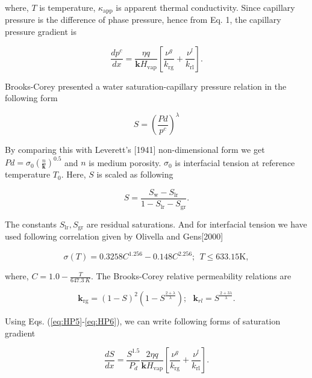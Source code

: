where, $T$ is temperature, $\kappa_{\mathrm {app}}$ is apparent thermal conductivity. Since capillary pressure is the difference of phase pressure, hence from Eq. 1, the capillary pressure gradient is

\begin{equation}
\frac{d p^c}{d x} = \frac{\eta q}{\mathbf k H_{\mathrm {vap}}}\left[\frac{\nu^g}{k_{\mathrm {rg}}} + \frac{\nu^l}{k_{\mathrm {rl}}}\right].
\label{eq:HP5}
\end{equation}

Brooks-Corey presented a water saturation-capillary pressure relation in the following form

\begin{equation}
S=\left(\frac{Pd}{p^c}\right)^\lambda
\label{eq:HP6}
\end{equation}

By comparing this with Leverett's [1941] non-dimensional form we get $Pd=\sigma_0\left(\frac{n}{\mathbf k}\right)^{0.5}$ and $n$ is medium porosity. $\sigma_0$ is interfacial tension at reference temperature $T_0$. Here, $S$ is scaled as following 

\begin{equation}
S=\frac{S_{\mathrm {w}}-S_{\mathrm {lr}}}{1-S_{\mathrm {lr}}-S_{\mathrm {gr}}}.
\label{eq:HP7}
\end{equation}

The constants $S_{\mathrm {lr}}, S_{\mathrm {gr}}$ are residual saturations. And for interfacial tension we have used following correlation given by Olivella and Gens[2000]

\begin{equation}
\sigma( T)={0.3258C^{1.256}} - {0.148C^{2.256}};~~ T\le 633.15 \mathrm K,
\label{eq:surface_tension}
\end{equation}

where, $C=1.0-\frac{T}{647.3~K}$. The Brooks-Corey relative permeability relations are

\begin{equation}
\mathbf k_{\mathrm {rg}}=\left(1-S\right)^2 \left(1-S^{\frac{2+\lambda}{\lambda}}\right);~~~\mathbf k_{rl}=S^{\frac{2+3\lambda}{\lambda}}.
\label{eq:HP8}
\end{equation}

Using Eqs. (\ref{eq:HP5}-\ref{eq:HP6}), we can write following forms of saturation gradient

\begin{equation}
\frac{d S}{d x}=\frac{S^{1.5}}{P_d}\frac{2\eta q}{\mathbf k H_{\mathrm {vap}}}\left[\frac{\nu^g}{k_{\mathrm {rg}}} + \frac{\nu^l}{k_{\mathrm {rl}}}\right].
\label{eq:HP9}
\end{equation}

